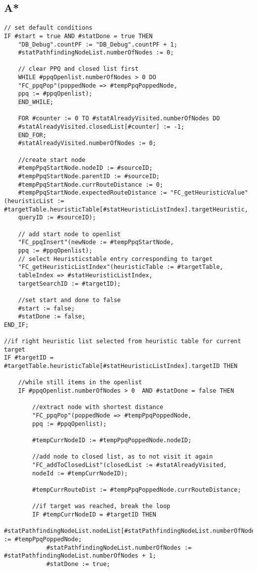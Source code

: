 	\subsection{A*}
	
	\begin{lstlisting}
// set default conditions
IF #start = true AND #statDone = true THEN
	"DB_Debug".countPF := "DB_Debug".countPF + 1;
	#statPathfindingNodeList.numberOfNodes := 0;
	
	// clear PPQ and closed list first
	WHILE #ppqOpenlist.numberOfNodes > 0 DO
	"FC_ppqPop"(poppedNode => #tempPpqPoppedNode,
	ppq := #ppqOpenlist);
	END_WHILE;
	
	FOR #counter := 0 TO #statAlreadyVisited.numberOfNodes DO
	#statAlreadyVisited.closedList[#counter] := -1;
	END_FOR;
	#statAlreadyVisited.numberOfNodes := 0;
	
	//create start node
	#tempPpqStartNode.nodeID := #sourceID;
	#tempPpqStartNode.parentID := #sourceID;
	#tempPpqStartNode.currRouteDistance := 0;
	#tempPpqStartNode.expectedRouteDistance := "FC_getHeuristicValue"(heuristicList := #targetTable.heuristicTable[#statHeuristicListIndex].targetHeuristic,
	queryID := #sourceID);
	
	// add start node to openlist
	"FC_ppqInsert"(newNode := #tempPpqStartNode,
	ppq := #ppqOpenlist);
	// select Heuristicstable entry corresponding to target
	"FC_getHeuristicListIndex"(heuristicTable := #targetTable,
	tableIndex => #statHeuristicListIndex,
	targetSearchID := #targetID);
	
	//set start and done to false
	#start := false;
	#statDone := false;
END_IF;

//if right heuristic list selected from heuristic table for current target
IF #targetID = #targetTable.heuristicTable[#statHeuristicListIndex].targetID THEN

	//while still items in the openlist
	IF #ppqOpenlist.numberOfNodes > 0  AND #statDone = false THEN 
	
		//extract node with shortest distance
		"FC_ppqPop"(poppedNode => #tempPpqPoppedNode,
		ppq := #ppqOpenlist);
		
		#tempCurrNodeID := #tempPpqPoppedNode.nodeID;
		
		//add node to closed list, as to not visit it again
		"FC_addToClosedList"(closedList := #statAlreadyVisited,
		nodeId := #tempCurrNodeID);
		
		#tempCurrRouteDist := #tempPpqPoppedNode.currRouteDistance;
		
		//if target was reached, break the loop
		IF #tempCurrNodeID = #targetID THEN
			#statPathfindingNodeList.nodeList[#statPathfindingNodeList.numberOfNodes] := #tempPpqPoppedNode;
			#statPathfindingNodeList.numberOfNodes := #statPathfindingNodeList.numberOfNodes + 1;
			#statDone := true;
		

\end{lstlisting}
